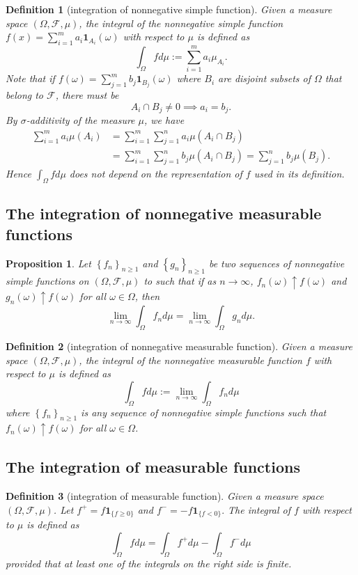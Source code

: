 \documentclass{report}
\newtheorem{definition}{Definition}[section]
\newtheorem{proposition}{Proposition}[section]
\theoremstyle{nonumberplain}
\begin{document}
\begin{definition}[integration of nonnegative simple function]
	Given a measure space $(\Omega, \mathcal{F},\mu)$, the integral of the nonnegative simple function $f(x)=\sum_{i=1}^ma_i\mathbf{1}_{A_i}(\omega)$ with respect to $\mu$
	is defined as
	\[
	\int_\Omega fd\mu:=\sum_{i=1}^ma_i\mu_{A_i}.
	\]
	Note that if $f(\omega)=\sum_{j=1}^mb_j\mathbf{1}_{B_j}(\omega)$ where $B_i$ are disjoint subsets
	of $\Omega$ that belong to $\mathcal{F}$, there must be
	\[
	A_{i} \cap B_{j} \neq 0\implies a_{i}=b_{j}.
	\]
	By $\sigma$-additivity of the measure $\mu$, we have
	\[
	\begin{aligned}
		\sum_{i=1}^{m} a_{i} \mu\left(A_{i}\right) &=\sum_{i=1}^{m} \sum_{j=1}^{n} a_{i} \mu\left(A_{i} \cap B_{j}\right) \\
		&=\sum_{i=1}^{m} \sum_{j=1}^{n} b_{j} \mu\left(A_{i} \cap B_{j}\right)=\sum_{j=1}^{n} b_{j} \mu\left(B_{j}\right).
	\end{aligned}
	\]
	Hence $\int_\Omega fd\mu$ does not depend on the representation of $f$ used in its definition.
\end{definition}
\subsection{The integration of nonnegative measurable functions}
\begin{proposition}
	Let $\left\{f_{n}\right\}_{n \ge 1}$ and $\left\{g_{n}\right\}_{n \ge 1}$ be two sequences of nonnegative simple functions on $(\Omega, \mathcal{F}, \mu)$ to such that if as $n \rightarrow \infty$, $f_{n}(\omega) \uparrow f(\omega)$ and $g_{n}(\omega) \uparrow f(\omega)$ for all $\omega \in \Omega$, then
	\[
	\lim_{n \rightarrow \infty} \int_\Omega f_{n} d \mu=\lim _{n \rightarrow \infty} \int_\Omega g_{n} d \mu.
	\]
\end{proposition}



\begin{definition}[integration of nonnegative measurable function]
	Given a measure space $(\Omega, \mathcal{F},\mu)$, the integral of the nonnegative measurable function $f$ with respect to $\mu$
	is defined as
	\[
	\int_\Omega fd\mu:=\lim _{n \rightarrow \infty} \int_\Omega f_{n} d \mu
	\]
	where $\left\{f_{n}\right\}_{n \geq 1}$ is any sequence of nonnegative simple functions such that $f_{n}(\omega) \uparrow f(\omega)$ for all $\omega\in\Omega$.
\end{definition}

\subsection{The integration of measurable functions}
\begin{definition}[integration of measurable function]
	Given a measure space $(\Omega, \mathcal{F},\mu)$. Let $f^{+}=f \mathbf{1}_{\{f \geq 0\}}$ and $f^{-}=-f \mathbf{1}_{\{f<0\}} .$ The integral of $f$ with respect to $\mu$ is defined as
	\[
	\int_\Omega f d \mu=\int_\Omega f^{+} d \mu-\int_\Omega f^{-} d \mu
	\]
	provided that at least one of the integrals on the right side is finite.
\end{definition}
\end{document}
